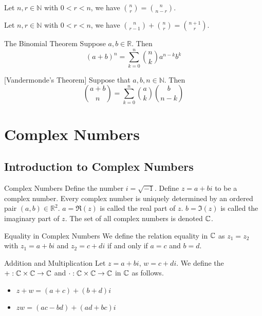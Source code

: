 \documentclass[a4paper]{article}
\begin{document}
\begin{prp}{}{} Let $n,r\in\mathbb{N}$ with $0<r<n$, we have $\binom{n}{r}=\binom{n}{n-r}$. 
\end{prp}

\begin{prp}{}{} Let $n,r\in\mathbb{N}$ with $0<r<n$, we have $\binom{n}{r-1}+\binom{n}{r}=\binom{n+1}{r}$. 
\end{prp}

\begin{thm}{The Binomial Theorem}{} Suppose $a,b\in\mathbb{R}$. Then $$(a+b)^n=\sum_{k=0}^n\binom{n}{k}a^{n-k}b^k$$
\end{thm}

\begin{thm}{}{}[Vandermonde's Theorem] Suppose that $a,b,n\in\mathbb{N}$. Then $$\binom{a+b}{n}=\sum_{k=0}^{n}\binom{a}{k}\binom{b}{n-k}$$
\end{thm}

\pagebreak
\section{Complex Numbers}
\subsection{Introduction to Complex Numbers}
\begin{defn}{Complex Numbers}{} Define the number $i=\sqrt{-1}$. Define $z=a+bi$ to be a complex number. Every complex number is uniquely determined by an ordered pair $(a,b)\in\mathbb{R}^2$. $a=\Re(z)$ is called the real part of $z$. $b=\Im(z)$ is called the imaginary part of $z$. The set of all complex numbers is denoted $\mathbb{C}$. 
\end{defn}

\begin{defn}{Equality in Complex Numbers}{} We define the relation equality in $\mathbb{C}$ as $z_1=z_2$ with $z_1=a+bi$ and $z_2=c+di$ if and only if $a=c$ and $b=d$. 
\end{defn}

\begin{defn}{Addition and Multiplication}{} Let $z=a+bi$, $w=c+di$. We define the $+:\mathbb{C}\times\mathbb{C}\to\mathbb{C}$ and $\cdot:\mathbb{C}\times\mathbb{C}\to\mathbb{C}$ in $\mathbb{C}$ as follows. 
\begin{itemize}
\item $z+w=(a+c)+(b+d)i$
\item $zw=(ac-bd)+(ad+bc)i$
\end{itemize}
\end{defn}
\end{document}
